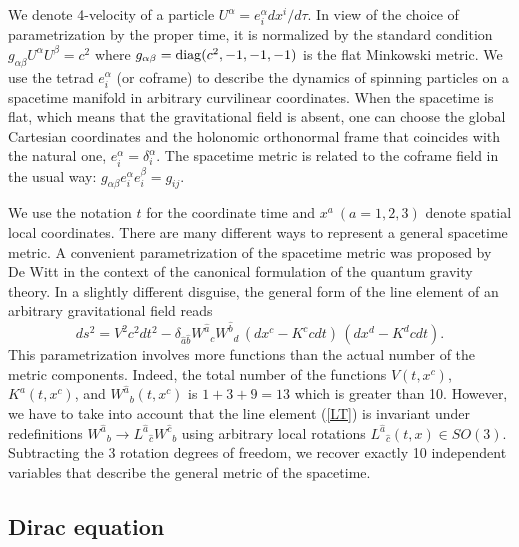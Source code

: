 \documentclass[preprint,showpacs,preprintnumbers,eqsecnum,amsmath,amssymb]{revtex4-1}
\begin{document}
We denote 4-velocity of a particle $U^\alpha = e^\alpha_i dx^i/d\tau$. In view of the
choice of parametrization by the proper time, it is normalized by the standard condition
$g_{\alpha\beta}U^\alpha U^\beta = c^2$ where $g_{\alpha\beta} = {\rm diag}(c^2, -1, -1, -1)$
is the flat Minkowski metric. We use the tetrad $e^\alpha_i$ (or coframe) to describe
the dynamics of spinning particles on a spacetime manifold in arbitrary curvilinear
coordinates. When the spacetime is flat, which means that the gravitational field is
absent, one can choose the global Cartesian coordinates and the holonomic
orthonormal frame that coincides with the natural one, $e^\alpha_i = \delta^\alpha_i$.
The spacetime metric is related to the coframe field in the usual way: $g_{\alpha\beta}
e^\alpha_ie^\beta_i = g_{ij}$.

We use the notation $t$ for the coordinate time and $x^a~ (a=1,2,3)$ denote spatial
local coordinates. There are many different ways to represent a general spacetime
metric. A convenient parametrization of the spacetime metric was proposed by De Witt
\cite{Dewitt} in the context of the canonical formulation of the quantum gravity theory.
In a slightly different disguise, the general form of the line element of an arbitrary
gravitational field reads
\begin{equation}\label{LT}
ds^2 = V^2c^2dt^2 - \delta_{\widehat{a}\widehat{b}}W^{\widehat
a}{}_c W^{\widehat b}{}_d\,(dx^c - K^ccdt)\,(dx^d - K^dcdt).
\end{equation}
This parametrization involves more functions than the actual number of the metric
components. Indeed, the total number of the functions $V(t,x^c)$, $K^a(t,x^c)$, and
$W^{\widehat a}{}_b(t,x^c)$ is $1+3+9=13$ which is greater than 10. However, we have to
take into account that the line element (\ref{LT}) is invariant under redefinitions
$W^{\widehat a}{}_b\longrightarrow L^{\widehat a}{}_{\widehat c}W^{\widehat c}{}_b$ using arbitrary
local rotations $L^{\widehat a}{}_{\widehat c}(t,x)\in SO(3)$. Subtracting the 3 rotation
degrees of freedom, we recover exactly 10 independent variables that describe the
general metric of the spacetime.


\subsection{Dirac equation}
\end{document}
